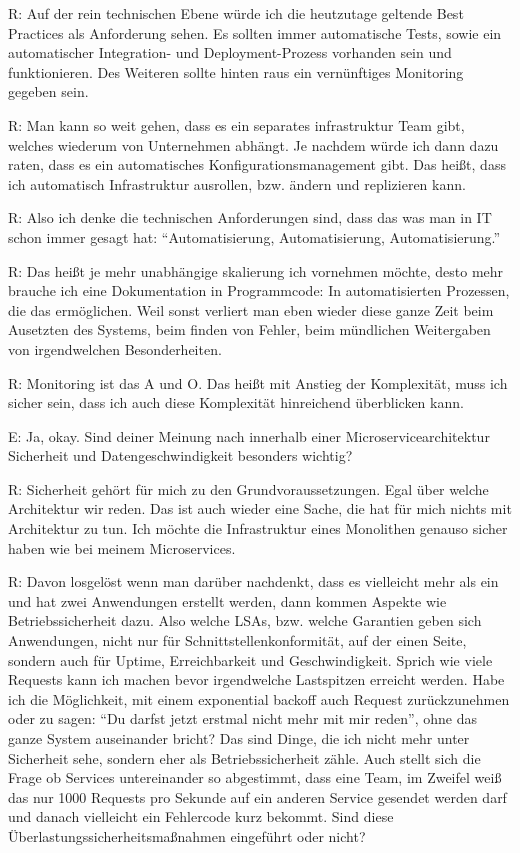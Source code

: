 R: Auf der rein technischen Ebene würde ich die heutzutage geltende Best Practices als Anforderung sehen. Es sollten immer automatische Tests, sowie ein automatischer Integration- und Deployment-Prozess vorhanden sein und funktionieren. Des Weiteren sollte hinten raus ein vernünftiges Monitoring gegeben sein.

R: Man kann so weit gehen, dass es ein separates infrastruktur Team gibt, welches wiederum von Unternehmen abhängt. Je nachdem würde ich dann dazu raten, dass es ein automatisches Konfigurationsmanagement gibt. Das heißt, dass ich automatisch Infrastruktur ausrollen, bzw. ändern und replizieren kann.

R: Also ich denke die technischen Anforderungen sind, dass das was man in IT schon immer gesagt hat:  “Automatisierung, Automatisierung, Automatisierung.”

R: Das heißt je mehr unabhängige skalierung ich vornehmen möchte, desto mehr brauche ich eine Dokumentation in Programmcode: In automatisierten Prozessen, die das ermöglichen.
Weil sonst verliert man eben wieder diese ganze Zeit beim Ausetzten des Systems, beim finden von Fehler, beim mündlichen Weitergaben von irgendwelchen Besonderheiten. 

R: Monitoring ist das A und O. Das heißt mit Anstieg der Komplexität, muss ich sicher sein, dass ich auch diese Komplexität hinreichend überblicken kann.

E: Ja, okay. Sind deiner Meinung nach innerhalb einer Microservicearchitektur Sicherheit und Datengeschwindigkeit besonders wichtig?

R: Sicherheit gehört für mich zu den Grundvoraussetzungen. Egal über welche Architektur wir reden. Das ist auch wieder eine Sache, die hat für mich nichts mit Architektur zu tun. Ich möchte  die Infrastruktur eines Monolithen genauso sicher haben wie bei meinem Microservices. 

R: Davon losgelöst wenn man darüber nachdenkt, dass es vielleicht mehr als ein und hat zwei Anwendungen erstellt werden, dann kommen Aspekte wie Betriebssicherheit dazu. Also welche LSAs, bzw. welche Garantien geben sich Anwendungen, nicht nur für Schnittstellenkonformität, auf der einen Seite, sondern auch für Uptime, Erreichbarkeit und Geschwindigkeit. Sprich wie viele Requests kann ich machen bevor irgendwelche Lastspitzen erreicht werden. Habe ich die Möglichkeit, mit einem exponential backoff auch Request zurückzunehmen oder zu sagen: “Du darfst jetzt erstmal nicht mehr mit mir reden”, ohne das ganze System auseinander bricht? Das sind Dinge, die ich nicht mehr unter Sicherheit sehe, sondern eher als Betriebssicherheit zähle. Auch stellt sich die Frage ob Services untereinander so abgestimmt, dass eine Team, im Zweifel weiß das nur 1000 Requests pro Sekunde auf ein anderen Service gesendet werden darf und danach vielleicht ein Fehlercode kurz bekommt. Sind diese Überlastungssicherheitsmaßnahmen eingeführt oder nicht?


